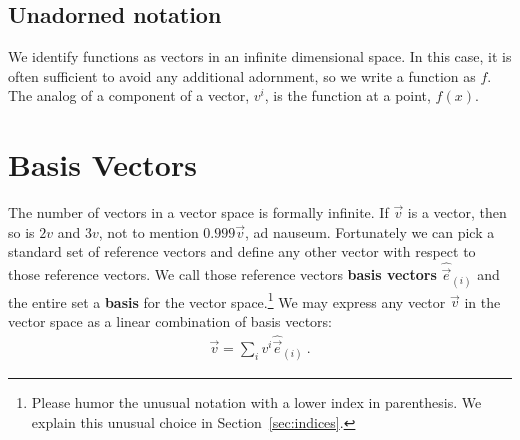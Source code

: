 \documentclass[
  11pt,
	colorful,
	raggedright,
]{tufte-style-thesis-flip}
\begin{document}
\subsection{Unadorned notation} We identify functions as vectors in an infinite dimensional space. In this case, it is often sufficient to avoid any additional adornment, so we write a function as $f$. The analog of a component of a vector, $v^i$, is the function at a point, $f(x)$.


\section{Basis Vectors}



The number of vectors in a vector space is formally infinite. If $\vec v$ is a vector, then so is $2v$ and $3v$, not to mention $0.999\vec{v}$, ad nauseum. Fortunately we can pick a standard set of reference vectors and define any other vector with respect to those reference vectors. We call those reference vectors \textbf{basis vectors} $\hat{\vec{e}}_{(i)}$ and the entire set a \textbf{basis} for the vector space.\footnote{Please humor the unusual notation with a lower index in parenthesis. We explain this unusual choice in Section~\ref{sec:indices}.} We may express any vector $\vec v$ in the vector space as a linear combination of basis vectors:
\begin{align}
  \vec{v} = \sum_i v^i\hat{\vec{e}}_{(i)} \ .
\end{align}
\end{document}
